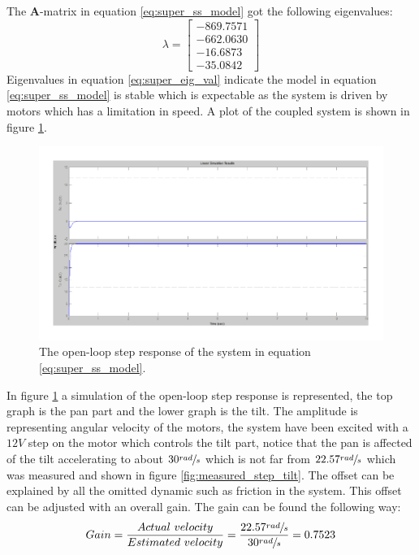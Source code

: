 The \textbf{A}-matrix in equation \ref{eq:super_ss_model} got the following eigenvalues:
\begin{equation}
 \lambda =
 \begin{bmatrix}
   - 869.7571\\
   - 662.0630\\
   - 16.6873\\
   - 35.0842
 \end{bmatrix}\label{eq:super_eig_val}
\end{equation}
Eigenvalues in equation \ref{eq:super_eig_val} indicate the model in equation \ref{eq:super_ss_model} is stable which is expectable as the system is driven by motors which has a limitation in speed. A plot of the coupled system is shown in figure \ref{fig:good_step}.
\begin{figure}[htb]
	\centering
	\includegraphics[width=\textwidth,trim=0 0 0 0]{graphics/GoodSim.pdf} %
	\caption{The open-loop step response of the system in equation \ref{eq:super_ss_model}.}
	\label{fig:good_step}			%
\end{figure}
In figure \ref{fig:good_step} a simulation of the open-loop step response is represented, the top graph is the pan part and the lower graph is the tilt. The amplitude is representing angular velocity of the motors, the system have been excited with a $12V$ step on the motor which controls the tilt part, notice that the pan is affected of the tilt accelerating to about $30\sfrac{rad}{s}$ which is not far from $22.57\sfrac{rad}{s}$ which was measured and shown in figure \ref{fig:measured_step_tilt}. The offset can be explained by all the omitted dynamic such as friction in the system. This offset can be adjusted with an overall gain. The gain can be found the following way:
\begin{equation}
	Gain = \frac{Actual\ velocity}{Estimated\ velocity} = \frac{22.57\sfrac{rad}{s}}{30\sfrac{rad}{s}} = 0.7523\label{eq:gain_constant}
\end{equation}

